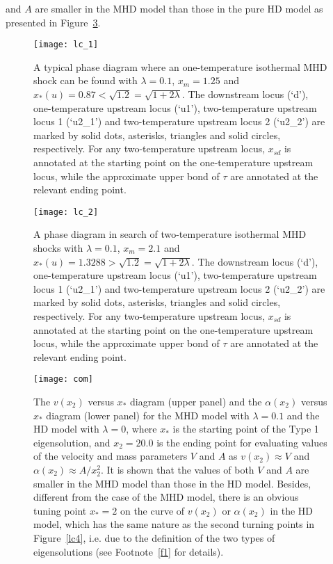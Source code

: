\documentclass[fleqn,usenatbib]{mnras}
\begin{document}
and $A$ are smaller in the MHD model than those in the pure HD model as presented in Figure~\ref{com}.

\begin{figure}
\centering
\texttt{[image: lc\_1]}
\caption{A typical phase diagram where an one-temperature isothermal MHD shock can be found with $\lambda=0.1$, $x_{m}=1.25$ and $x_{*}(u)=0.87<\sqrt{1.2}=\sqrt{1+2\lambda}$. The downstream locus (`d'), one-temperature upstream locus (`u1'), two-temperature upstream locus 1 (`u2\_1') and two-temperature upstream locus 2 (`u2\_2') are marked by solid dots, asterisks, triangles and solid circles, respectively. For any two-temperature upstream locus, $x_{sd}$ is annotated at the starting point on the one-temperature upstream locus, while the approximate upper bond of $\tau$ are annotated at the relevant ending point.}
\label{lc1}
\end{figure}

\begin{figure}
\centering
\texttt{[image: lc\_2]}
\caption{A phase diagram in search of two-temperature isothermal MHD shocks with $\lambda=0.1$, $x_{m}=2.1$ and $x_{*}(u)=1.3288>\sqrt{1.2}=\sqrt{1+2\lambda}$. The downstream locus (`d'), one-temperature upstream locus (`u1'), two-temperature upstream locus 1 (`u2\_1') and two-temperature upstream locus 2 (`u2\_2') are marked by solid dots, asterisks, triangles and solid circles, respectively. For any two-temperature upstream locus, $x_{sd}$ is annotated at the starting point on the one-temperature upstream locus, while the approximate upper bond of $\tau$ are annotated at the relevant ending point.}
\label{lc2}
\end{figure}

\begin{figure}
\centering
\texttt{[image: com]}
\caption{The $v(x_{2})$ versus $x_{*}$ diagram (upper panel) and the $\alpha(x_{2})$ versus $x_{*}$ diagram (lower panel) for the MHD model with $\lambda=0.1$ and the HD model with $\lambda=0$, where $x_{*}$ is the starting point of the Type 1 eigensolution, and $x_{2}=20.0$ is the ending point for evaluating values of the velocity and mass parameters $V$ and $A$ as $v(x_{2})\approx V$ and $\alpha(x_{2})\approx A/x_{2}^{2}$. It is shown that the values of both $V$ and $A$ are smaller in the MHD model than those in the HD model. Besides, different from the case of the MHD model, there is an obvious tuning point $x_{*}=2$ on the curve of $v(x_{2})$ or $\alpha(x_{2})$ in the HD model, which has the same nature as the second turning points in Figure~\ref{lc4}, i.e. due to the definition of the two types of eigensolutions (see Footnote~\ref{f1} for details).}
\label{com}
\end{figure}
\end{document}
